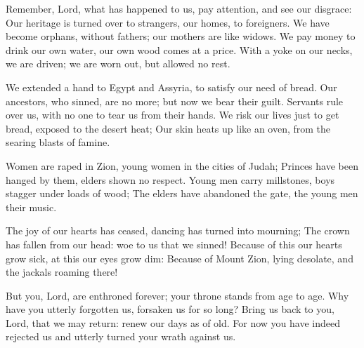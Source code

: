 Remember, Lord, what has happened to us,
    pay attention, and see our disgrace:
Our heritage is turned over to strangers,
    our homes, to foreigners.
We have become orphans, without fathers;
    our mothers are like widows.
We pay money to drink our own water,
    our own wood comes at a price.
With a yoke on our necks, we are driven;
    we are worn out, but allowed no rest.

We extended a hand to Egypt and Assyria,
    to satisfy our need of bread.
Our ancestors, who sinned, are no more;
    but now we bear their guilt.
Servants rule over us,
    with no one to tear us from their hands.
We risk our lives just to get bread,
    exposed to the desert heat;
Our skin heats up like an oven,
    from the searing blasts of famine.

Women are raped in Zion,
    young women in the cities of Judah;
Princes have been hanged by them,
    elders shown no respect.
Young men carry millstones,
    boys stagger under loads of wood;
The elders have abandoned the gate,
    the young men their music.

The joy of our hearts has ceased,
    dancing has turned into mourning;
The crown has fallen from our head:
    woe to us that we sinned!
Because of this our hearts grow sick,
    at this our eyes grow dim:
Because of Mount Zion, lying desolate,
    and the jackals roaming there!

But you, Lord, are enthroned forever;
    your throne stands from age to age.
Why have you utterly forgotten us,
    forsaken us for so long?
Bring us back to you, Lord, that we may return:
    renew our days as of old.
For now you have indeed rejected us
    and utterly turned your wrath against us.